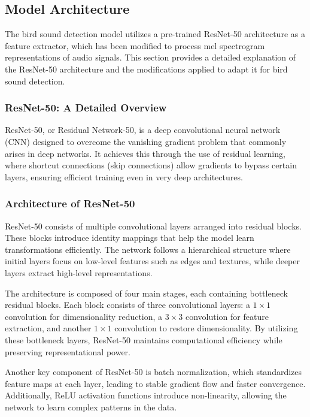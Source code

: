       \subsection{Model Architecture}

      The bird sound detection model utilizes a pre-trained ResNet-50 architecture as a feature extractor, which has been modified to process mel spectrogram representations of audio signals. This section provides a detailed explanation of the ResNet-50 architecture and the modifications applied to adapt it for bird sound detection.

      \subsubsection{ResNet-50: A Detailed Overview}
      ResNet-50, or Residual Network-50, is a deep convolutional neural network (CNN) designed to overcome the vanishing gradient problem that commonly arises in deep networks. It achieves this through the use of residual learning, where shortcut connections (skip connections) allow gradients to bypass certain layers, ensuring efficient training even in very deep architectures.

      \subsubsection{Architecture of ResNet-50}
      ResNet-50 consists of multiple convolutional layers arranged into residual blocks. These blocks introduce identity mappings that help the model learn transformations efficiently. The network follows a hierarchical structure where initial layers focus on low-level features such as edges and textures, while deeper layers extract high-level representations.

      The architecture is composed of four main stages, each containing bottleneck residual blocks. Each block consists of three convolutional layers: a \(1\times1\) convolution for dimensionality reduction, a \(3\times3\) convolution for feature extraction, and another \(1\times1\) convolution to restore dimensionality. By utilizing these bottleneck layers, ResNet-50 maintains computational efficiency while preserving representational power.

      Another key component of ResNet-50 is batch normalization, which standardizes feature maps at each layer, leading to stable gradient flow and faster convergence. Additionally, ReLU activation functions introduce non-linearity, allowing the network to learn complex patterns in the data.

